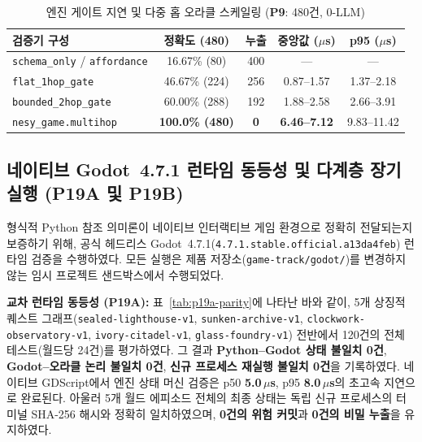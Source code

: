 \begin{table}[!tbp]
\caption{엔진 게이트 지연 및 다중 홉 오라클 스케일링 (\textbf{P9}: 480건, 0-LLM)}
\label{tab:tog-datalog}
\centering
\scriptsize
\setlength{\tabcolsep}{3pt}
\begin{tabularx}{\columnwidth}{@{}lcccc@{}}
\toprule
\textbf{검증기 구성} & \textbf{정확도 (480)} & \textbf{누출} & \textbf{중앙값 ($\mu$s)} & \textbf{p95 ($\mu$s)} \\
\midrule
\texttt{schema\_only} / \texttt{affordance} & 16.67\% (80) & 400 & --- & --- \\
\texttt{flat\_1hop\_gate} & 46.67\% (224) & 256 & 0.87--1.57 & 1.37--2.18 \\
\texttt{bounded\_2hop\_gate} & 60.00\% (288) & 192 & 1.88--2.58 & 2.66--3.91 \\
\texttt{nesy\_game.multihop} & \textbf{100.0\% (480)} & \textbf{0} & \textbf{6.46--7.12} & 9.83--11.42 \\
\bottomrule
\end{tabularx}
\end{table}

\subsection{네이티브 Godot~4.7.1 런타임 동등성 및 다계층 장기 실행 (\textbf{P19A} 및 \textbf{P19B})}\label{sec:tog-p19}
형식적 Python 참조 의미론이 네이티브 인터랙티브 게임 환경으로 정확히 전달되는지 보증하기 위해, 공식 헤드리스 Godot~4.7.1(\texttt{4.7.1.stable.official.a13da4feb}) 런타임 검증을 수행하였다. 모든 실행은 제품 저장소(\texttt{game-track/godot/})를 변경하지 않는 임시 프로젝트 샌드박스에서 수행되었다.

\textbf{교차 런타임 동등성 (\textbf{P19A}):} 표~\ref{tab:p19a-parity}에 나타난 바와 같이, 5개 상징적 퀘스트 그래프(\texttt{sealed-lighthouse-v1}, \texttt{sunken-archive-v1}, \texttt{clockwork-observatory-v1}, \texttt{ivory-citadel-v1}, \texttt{glass-foundry-v1}) 전반에서 120건의 전체 테스트(월드당 24건)를 평가하였다. 그 결과 \textbf{Python--Godot 상태 불일치 0건}, \textbf{Godot--오라클 논리 불일치 0건}, \textbf{신규 프로세스 재실행 불일치 0건}을 기록하였다. 네이티브 GDScript에서 엔진 상태 머신 검증은 p50 \textbf{5.0\,$\mu$s}, p95 \textbf{8.0\,$\mu$s}의 초고속 지연으로 완료된다. 아울러 5개 월드 에피소드 전체의 최종 상태는 독립 신규 프로세스의 터미널 SHA-256 해시와 정확히 일치하였으며, \textbf{0건의 위험 커밋}과 \textbf{0건의 비밀 누출}을 유지하였다.

